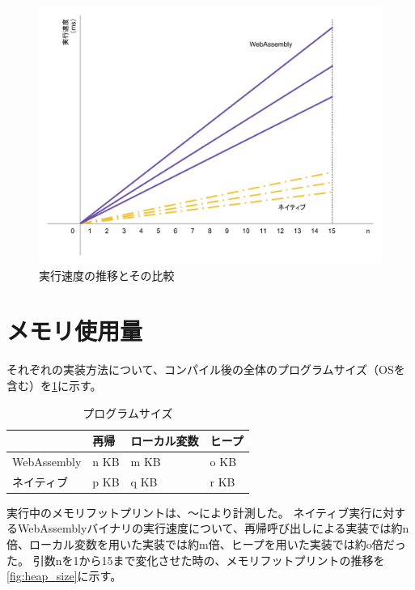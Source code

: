 \begin{figure}[htbp]
  \caption{実行速度の推移とその比較}
  \label{fig:exec_time}
  \begin{center}
    \includegraphics[bb=0 0 800 600,width=12cm]{img/exec_time.pdf}
  \end{center}
\end{figure}

\section{メモリ使用量}

それぞれの実装方法について、コンパイル後の全体のプログラムサイズ（OSを含む）を\ref{tb:program_size}に示す。

\begin{table}[]
  \caption{プログラムサイズ}
  \label{tb:program_size}
  \begin{center}
    \begin{tabular}{|l|l|l|l|}
      \hline
      & 再帰 & ローカル変数 & ヒープ \\ \hline
      WebAssembly & n KB & m KB & o KB \\ \hline
      ネイティブ & p KB & q KB & r KB \\ \hline
    \end{tabular}
  \end{center}
\end{table}

実行中のメモリフットプリントは、〜により計測した。
ネイティブ実行に対するWebAssemblyバイナリの実行速度について、再帰呼び出しによる実装では約n倍、ローカル変数を用いた実装では約m倍、ヒープを用いた実装では約o倍だった。
引数nを1から15まで変化させた時の、メモリフットプリントの推移を\ref{fig:heap_size}に示す。

